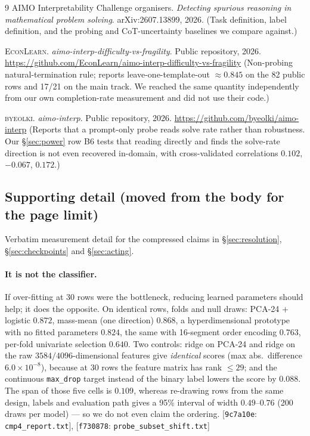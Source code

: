 \documentclass[10pt]{article}
\newcommand{\cmt}[2]{{\footnotesize\textsf{[}\texttt{#1}\textsf{:} #2\textsf{]}}}
\begin{document}
\begin{thebibliography}{9}
AIMO Interpretability Challenge organisers.
\emph{Detecting spurious reasoning in mathematical problem solving}.
arXiv:2607.13899, 2026. (Task definition, label definition, and the probing and
CoT-uncertainty baselines we compare against.)

\textsc{EconLearn}. \emph{aimo-interp-difficulty-vs-fragility}. Public repository, 2026.
\url{https://github.com/EconLearn/aimo-interp-difficulty-vs-fragility}
(Non-probing natural-termination rule; reports leave-one-template-out $\approx 0.845$ on the 82
public rows and 17/21 on the main track. We reached the same quantity independently from our own
completion-rate measurement and did not use their code.)

\textsc{byeolki}. \emph{aimo-interp}. Public repository, 2026.
\url{https://github.com/byeolki/aimo-interp}
(Reports that a prompt-only probe reads solve rate rather than robustness. Our \S\ref{sec:power}
row B6 tests that reading directly and finds the solve-rate direction is not even recovered
in-domain, with cross-validated correlations $0.102$, $-0.067$, $0.172$.)
\end{thebibliography}

\appendix
\subsection*{Supporting detail (moved from the body for the page limit)}
\label{app:detail}
Verbatim measurement detail for the compressed claims in \S\ref{sec:resolution}, \S\ref{sec:checkpoints} and \S\ref{sec:acting}.

\paragraph{It is not the classifier.} If over-fitting at 30 rows were the bottleneck, reducing
learned parameters should help; it does the opposite. On identical rows, folds and null draws:
PCA-24 + logistic $0.872$, mass-mean (one direction) $0.868$, a hyperdimensional prototype with no
fitted parameters $0.824$, the same with 16-segment order encoding $0.763$, per-fold univariate
selection $0.640$. Two controls: ridge on PCA-24 and ridge on the raw $3584/4096$-dimensional
features give \emph{identical} scores (max abs.\ difference $6.0\times10^{-8}$), because at 30 rows
the feature matrix has rank $\le 29$; and the continuous \texttt{max\_drop} target instead of the
binary label lowers the score by $0.088$. The span of those five cells is $0.109$, whereas re-drawing
rows from the same design, labels and evaluation path gives a 95\% interval of width $0.49$--$0.76$
(200 draws per model) --- so we do not even claim the ordering.
\cmt{9c7a10e}{\texttt{cmp4\_report.txt}}, \cmt{f730878}{\texttt{probe\_subset\_shift.txt}}
\end{document}
